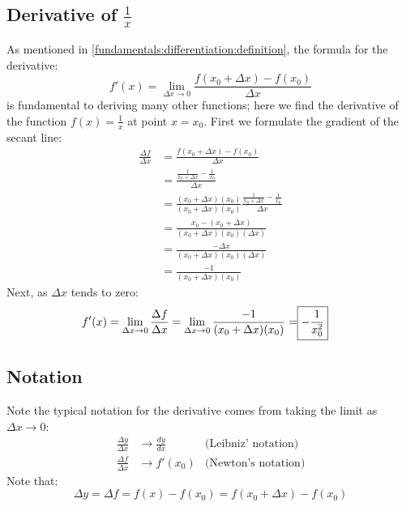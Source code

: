 \documentclass{report}
\begin{document}
\subsection{Derivative of $\frac{1}{x}$} %
As mentioned in \ref{fundamentals:differentiation:definition}, the formula for the derivative:
\begin{equation*}
f'(x)=\lim_{\Delta x\to 0}\frac{f(x_0+\Delta x)-f(x_0)}{\Delta x}
\end{equation*}
is fundamental to deriving many other functions; here we find the derivative of the function
$f(x)=\frac{1}{x}$ at point $x=x_0$. First we formulate the gradient of the secant line:
\begin{align*}
\frac{\Delta f}{\Delta x}&=\frac{f(x_0+\Delta x)-f(x_0)}{\Delta x}\\
&=\frac{\frac{1}{x_0+\Delta x}-\frac{1}{x_0}}{\Delta x}\\
&=\frac{(x_0+\Delta x)(x_0)}{(x_0+\Delta x)(x_0)}
\frac{\frac{1}{x_0+\Delta x}-\frac{1}{x_0}}{\Delta x}\\
&=\frac{x_0-(x_0+\Delta x)}{(x_0+\Delta x)(x_0)(\Delta x)}\\
&=\frac{-\Delta x}{(x_0+\Delta x)(x_0)(\Delta x)}\\
&=\frac{-1}{(x_0+\Delta x)(x_0)}
\end{align*}
Next, as $\Delta x$ tends to zero:
\begin{align*}
f'(x)=\lim_{\Delta x\to 0}\frac{\Delta f}{\Delta x}
=\lim_{\Delta x\to 0}\frac{-1}{(x_0+\Delta x)(x_0)}=\Aboxed{-\frac{1}{x_0^2}}
\end{align*}

\subsection{Notation} %
Note the typical notation for the derivative comes from taking the limit as $\Delta x\to 0$:
\begin{align*}
\frac{\Delta y}{\Delta x}&\to \frac{dy}{dx}&\text{(Leibniz' notation)}\\
\frac{\Delta f}{\Delta x}&\to f'(x_0)&\text{(Newton's notation)}
\end{align*}
Note that:
\begin{equation*}
\Delta y=\Delta f=f(x)-f(x_0)=f(x_0+\Delta x)-f(x_0)
\end{equation*}

\newpage
\end{document}
